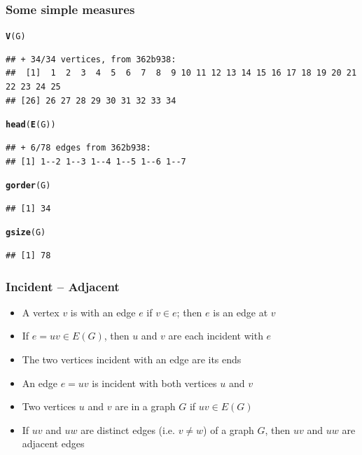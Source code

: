 \documentclass[aspectratio=169]{beamer}\usepackage[]{graphicx}\usepackage[]{xcolor}
\makeatletter
\newcommand{\hldef}[1]{\textcolor[rgb]{0.345,0.345,0.345}{#1}}%
\newcommand{\hlkwd}[1]{\textcolor[rgb]{0.737,0.353,0.396}{\textbf{#1}}}%
\newenvironment{kframe}{%
 \def\at@end@of@kframe{}%
 \ifinner\ifhmode%
  \def\at@end@of@kframe{\end{minipage}}%
  \begin{minipage}{\columnwidth}%
 \fi\fi%
 \def\FrameCommand##1{\hskip\@totalleftmargin \hskip-\fboxsep
 \colorbox{shadecolor}{##1}\hskip-\fboxsep
     \hskip-\linewidth \hskip-\@totalleftmargin \hskip\columnwidth}%
 \MakeFramed {\advance\hsize-\width
   \@totalleftmargin\z@ \linewidth\hsize
   \@setminipage}}%
 {\par\unskip\endMakeFramed%
 \at@end@of@kframe}
\newenvironment{knitrout}{}{} %
\makeatother
\begin{document}
\begin{frame}[fragile]\frametitle{Some simple measures}
\begin{knitrout}
\color{fgcolor}\begin{kframe}
\begin{alltt}
\hlkwd{V}\hldef{(G)}
\end{alltt}
\begin{verbatim}
## + 34/34 vertices, from 362b938:
##  [1]  1  2  3  4  5  6  7  8  9 10 11 12 13 14 15 16 17 18 19 20 21 22 23 24 25
## [26] 26 27 28 29 30 31 32 33 34
\end{verbatim}
\begin{alltt}
\hlkwd{head}\hldef{(}\hlkwd{E}\hldef{(G))}
\end{alltt}
\begin{verbatim}
## + 6/78 edges from 362b938:
## [1] 1--2 1--3 1--4 1--5 1--6 1--7
\end{verbatim}
\begin{alltt}
\hlkwd{gorder}\hldef{(G)}
\end{alltt}
\begin{verbatim}
## [1] 34
\end{verbatim}
\begin{alltt}
\hlkwd{gsize}\hldef{(G)}
\end{alltt}
\begin{verbatim}
## [1] 78
\end{verbatim}
\end{kframe}
\end{knitrout}
\end{frame}

\begin{frame}\frametitle{Incident -- Adjacent}
	\begin{definition}[Incident]
	\begin{itemize}
	\item A vertex $v$ is  with an edge $e$ if $v\in e$; then $e$ is an edge at $v$
	\item If $e=uv\in E(G)$, then $u$ and $v$ are each incident with $e$
	\item The two vertices incident with an edge are its ends
	\item An edge $e=uv$ is incident with both vertices $u$ and $v$
	\end{itemize}
	\end{definition}
	\vfill
	\begin{definition}[Adjacent]
	\begin{itemize}
	\item Two vertices $u$ and $v$ are  in a graph $G$ if $uv\in E(G)$
	\item If $uv$ and $uw$ are distinct edges (i.e. $v\not=w$) of a graph $G$, then $uv$ and $uw$ are adjacent edges
	\end{itemize}
	\end{definition}
\end{frame}
\end{document}
